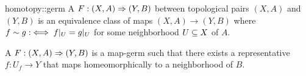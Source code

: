 \begin{mydefinition}{homotopy::germ}
    A  $F: (X, A) \Rightarrow{} (Y, B)$ between topological pairs $(X, A)$ and $(Y, B)$ is an equivalence class of maps $(X, A) \to (Y, B)$
    where $f \sim g :\iff f\vert_{U} = g\vert_{U}$ for some neighborhood $U \subseteq{} X$ of $A$. 
\end{mydefinition}

\begin{myparagraph}
    A  $F: (X, A) \Rightarrow{} (Y, B)$ is a map-germ
    such that there exists a representative $f: U_f \to Y$ that maps homeomorphically to a neighborhood of $B$.  
\end{myparagraph}